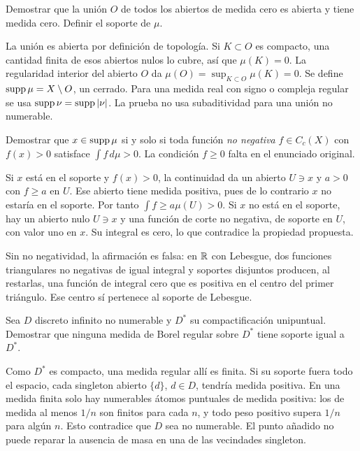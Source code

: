 \begin{ejercicio}\label{ej:v2-l32-4}
Demostrar que la unión $O$ de todos los abiertos de medida cero es abierta y tiene medida cero. Definir el soporte de $\mu$.
\end{ejercicio}
\begin{solucion}
La unión es abierta por definición de topología. Si $K\subset O$ es compacto, una cantidad finita de esos abiertos nulos lo cubre, así que $\mu(K)=0$. La regularidad interior del abierto $O$ da $\mu(O)=\sup_{K\subset O}\mu(K)=0$. Se define $\operatorname{supp}\mu=X\setminus O$, un cerrado. Para una medida real con signo o compleja regular se usa $\operatorname{supp}\nu=\operatorname{supp}|\nu|$. La prueba no usa subaditividad para una unión no numerable.
\end{solucion}

\begin{ejercicio}\label{ej:v2-l32-5}
Demostrar que $x\in\operatorname{supp}\mu$ si y solo si toda función \emph{no negativa} $f\in C_c(X)$ con $f(x)>0$ satisface $\int f\,d\mu>0$. La condición $f\ge0$ falta en el enunciado original.
\end{ejercicio}
\begin{solucion}
Si $x$ está en el soporte y $f(x)>0$, la continuidad da un abierto $U\ni x$ y $a>0$ con $f\ge a$ en $U$. Ese abierto tiene medida positiva, pues de lo contrario $x$ no estaría en el soporte. Por tanto $\int f\ge a\mu(U)>0$. Si $x$ no está en el soporte, hay un abierto nulo $U\ni x$ y una función de corte no negativa, de soporte en $U$, con valor uno en $x$. Su integral es cero, lo que contradice la propiedad propuesta.

Sin no negatividad, la afirmación es falsa: en $\mathbb R$ con Lebesgue, dos funciones triangulares no negativas de igual integral y soportes disjuntos producen, al restarlas, una función de integral cero que es positiva en el centro del primer triángulo. Ese centro sí pertenece al soporte de Lebesgue.
\end{solucion}

\begin{ejercicio}\label{ej:v2-l32-6}
Sea $D$ discreto infinito no numerable y $D^*$ su compactificación unipuntual. Demostrar que ninguna medida de Borel regular sobre $D^*$ tiene soporte igual a $D^*$.
\end{ejercicio}
\begin{solucion}
Como $D^*$ es compacto, una medida regular allí es finita. Si su soporte fuera todo el espacio, cada singleton abierto $\{d\}$, $d\in D$, tendría medida positiva. En una medida finita solo hay numerables átomos puntuales de medida positiva: los de medida al menos $1/n$ son finitos para cada $n$, y todo peso positivo supera $1/n$ para algún $n$. Esto contradice que $D$ sea no numerable. El punto añadido no puede reparar la ausencia de masa en una de las vecindades singleton.
\end{solucion}

